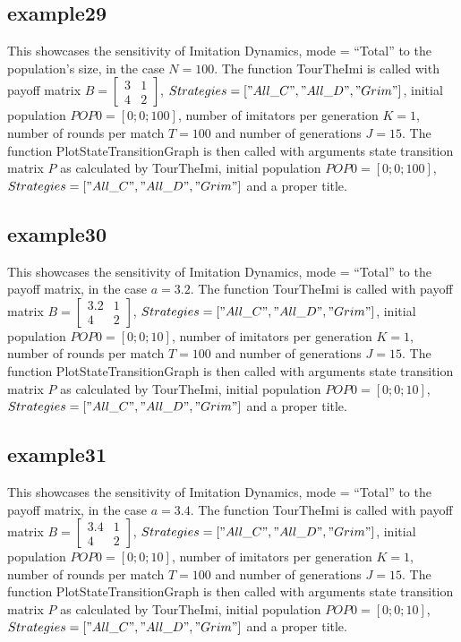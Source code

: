 \subsection{example29}
This showcases the sensitivity of Imitation Dynamics, mode = ``Total'' to the population's size, in the case $N=100$. The function TourTheImi is called with payoff matrix $B = \begin{bmatrix} 3 & 1 \\ 4 & 2 \end{bmatrix}$, $Strategies = ["All\_C", "All\_D", "Grim"]$, initial population $POP0 = [0; 0; 100]$, number of imitators per generation $K=1$, number of rounds per match $T = 100$ and number of generations $J = 15$. The function PlotStateTransitionGraph is then called with arguments state transition matrix $P$ as calculated by TourTheImi, initial population $POP0 = [0; 0; 100]$, $Strategies = ["All\_C", "All\_D", "Grim"]$ and a proper title.

\subsection{example30}
This showcases the sensitivity of Imitation Dynamics, mode = ``Total'' to the payoff matrix, in the case $a = 3.2$. The function TourTheImi is called with payoff matrix $B = \begin{bmatrix} 3.2 & 1 \\ 4 & 2 \end{bmatrix}$, $Strategies = ["All\_C", "All\_D", "Grim"]$, initial population $POP0 = [0; 0; 10]$, number of imitators per generation $K=1$, number of rounds per match $T = 100$ and number of generations $J = 15$. The function PlotStateTransitionGraph is then called with arguments state transition matrix $P$ as calculated by TourTheImi, initial population $POP0 = [0; 0; 10]$, $Strategies = ["All\_C", "All\_D", "Grim"]$ and a proper title.

\subsection{example31}
This showcases the sensitivity of Imitation Dynamics, mode = ``Total'' to the payoff matrix, in the case $a = 3.4$. The function TourTheImi is called with payoff matrix $B = \begin{bmatrix} 3.4 & 1 \\ 4 & 2 \end{bmatrix}$, $Strategies = ["All\_C", "All\_D", "Grim"]$, initial population $POP0 = [0; 0; 10]$, number of imitators per generation $K=1$, number of rounds per match $T = 100$ and number of generations $J = 15$. The function PlotStateTransitionGraph is then called with arguments state transition matrix $P$ as calculated by TourTheImi, initial population $POP0 = [0; 0; 10]$, $Strategies = ["All\_C", "All\_D", "Grim"]$ and a proper title.

